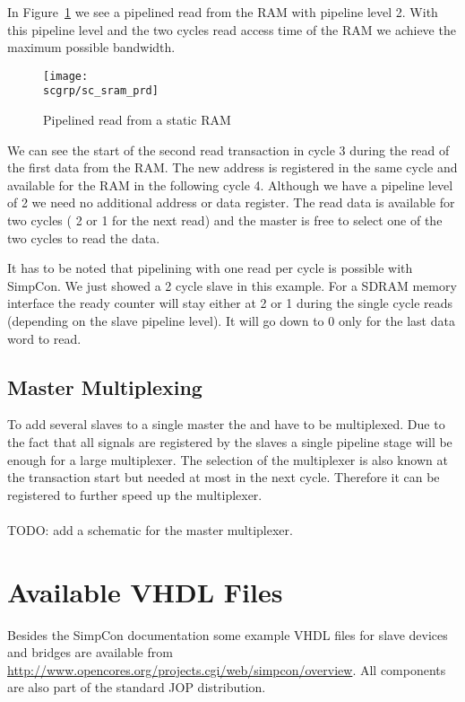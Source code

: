 In Figure~\ref{fig:sc:sram:prd} we see a pipelined read from the RAM
with pipeline level 2. With this pipeline level and the two cycles
read access time of the RAM we achieve the maximum possible
bandwidth.

\begin{figure}
    \centering
    \texttt{[image: \\scgrp/sc\_sram\_prd]}
    \caption{Pipelined read from a static RAM}
    \label{fig:sc:sram:prd}
\end{figure}

We can see the start of the second read transaction in cycle 3
during the read of the first data from the RAM. The new address is
registered in the same cycle and available for the RAM in the
following cycle 4. Although we have a pipeline level of 2 we need no
additional address or data register. The read data is available for
two cycles ( 2 or 1 for the next read) and the master
is free to select one of the two cycles to read the data.

It has to be noted that pipelining with one read per cycle is
possible with SimpCon. We just showed a 2 cycle slave in this
example. For a SDRAM memory interface the ready counter will stay
either at 2 or 1 during the single cycle reads (depending on the
slave pipeline level). It will go down to 0 only for the last data
word to read.

\subsection{Master Multiplexing}

To add several slaves to a single master the  and
 have to be multiplexed. Due to the fact that all
 signals are registered by the slaves a single
pipeline stage will be enough for a large multiplexer. The selection
of the multiplexer is also known at the transaction start but needed
at most in the next cycle. Therefore it can be registered to further
speed up the multiplexer.
\\
\\
TODO: add a schematic for the master  multiplexer.

\section{Available VHDL Files}

Besides the SimpCon documentation some example VHDL files for slave
devices and bridges are available from
\url{http://www.opencores.org/projects.cgi/web/simpcon/overview}.
All components are also part of the standard JOP distribution.



